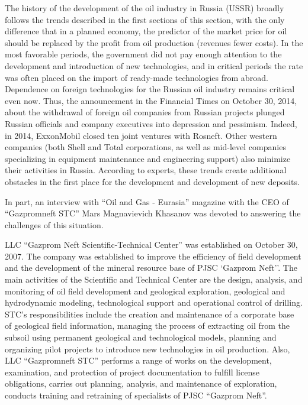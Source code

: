 \documentclass[12pt]{report}
\theoremstyle{definition}
\begin{document}
The history of the development of the oil industry in Russia (USSR) broadly follows the trends described in the first sections of this section, with the only difference that in a planned economy, the predictor of the market price for oil should be replaced by the profit from oil production (revenues fewer costs).
In the most favorable periods, the government did not pay enough attention to the development and introduction of new technologies, and in critical periods the rate was often placed on the import of ready-made technologies from abroad.
Dependence on foreign technologies for the Russian oil industry remains critical even now.
Thus, the announcement in the Financial Times on October 30, 2014, about the withdrawal of foreign oil companies from Russian projects plunged Russian officials and company executives into depression and pessimism.
Indeed, in 2014, ExxonMobil closed ten joint ventures with Rosneft.
Other western companies (both Shell and Total corporations, as well as mid-level companies specializing in equipment maintenance and engineering support) also minimize their activities in Russia.
According to experts, these trends create additional obstacles in the first place for the development and development of new deposits.

In part, an interview with ``Oil and Gas - Eurasia'' magazine with the CEO of ``Gazpromneft STC'' Mars Magnavievich Khasanov was devoted to answering the challenges of this situation.

LLC ``Gazprom Neft Scientific-Technical Center'' was established on October 30, 2007.
The company was established to improve the efficiency of field development and the development of the mineral resource base of PJSC `Gazprom Neft''.
The main activities of the Scientific and Technical Center are the design, analysis, and monitoring of oil field development and geological exploration, geological and hydrodynamic modeling, technological support and operational control of drilling.
STC’s responsibilities include the creation and maintenance of a corporate base of geological field information, managing the process of extracting oil from the subsoil using permanent geological and technological models, planning and organizing pilot projects to introduce new technologies in oil production.
Also, LLC ``Gazpromneft STC'' performs a range of works on the development, examination, and protection of project documentation to fulfill license obligations, carries out planning, analysis, and maintenance of exploration, conducts training and retraining of specialists of PJSC ``Gazprom Neft''.
\end{document}

